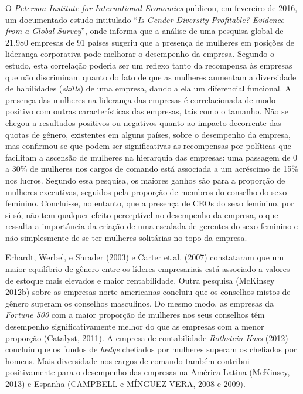 O \emph{Peterson Institute for International Economics} publicou, em
fevereiro de 2016, um documentado estudo intitulado ``\emph{Is Gender
Diversity Profitable? Evidence from a Global Survey}'', onde informa que
a análise de uma pesquisa global de 21,980 empresas de 91 países sugeriu
que a presença de mulheres em posições de liderança corporativa pode
melhorar o desempenho da empresa. Segundo o estudo, esta correlação
poderia ser um reflexo tanto da recompensa às empresas que não
discriminam quanto do fato de que as mulheres aumentam a diversidade de
habilidades (\emph{skills}) de uma empresa, dando a ela um diferencial
funcional. A presença das mulheres na liderança das empresas é
correlacionada de modo positivo com outras características das empresas,
tais como o tamanho. Não se chegou a resultados positivos ou negativos
quanto ao impacto decorrente das quotas de gênero, existentes em alguns
países, sobre o desempenho da empresa, mas confirmou-se que podem ser
significativas as recompensas por políticas que facilitam a ascensão de
mulheres na hierarquia das empresas: uma passagem de 0 a 30\% de
mulheres nos cargos de comando está associada a um acréscimo de 15\% nos
lucros. Segundo essa pesquisa, os maiores ganhos são para a proporção de
mulheres executivas, seguidos pela proporção de membros do conselho do
sexo feminino. Conclui-se, no entanto, que a presença de CEOs do sexo
feminino, por si só, não tem qualquer efeito perceptível no desempenho
da empresa, o que ressalta a importância da criação de uma escalada de
gerentes do sexo feminino e não simplesmente de se ter mulheres
solitárias no topo da empresa.

Erhardt, Werbel, e Shrader (2003) e Carter et.al. (2007) constataram que
um maior equilíbrio de gênero entre os líderes empresariais está
associado a valores de estoque mais elevados e maior rentabilidade.
Outra pesquisa (McKinsey 2012b) sobre as empresas norte-americanas
concluiu que os conselhos mistos de gênero superam os conselhos
masculinos. Do mesmo modo, as empresas da \emph{Fortune 500} com a maior
proporção de mulheres nos seus conselhos têm desempenho
significativamente melhor do que as empresas com a menor proporção
(Catalyst, 2011). A empresa de contabilidade \emph{Rothstein Kass}
(2012) concluiu que os fundos de \emph{hedge} chefiados por mulheres
superam os chefiados por homens. Mais diversidade nos cargos de comando
também contribui positivamente para o desempenho das empresas na América
Latina (McKinsey, 2013) e Espanha (CAMPBELL e MÍNGUEZ-VERA, 2008 e
2009).

